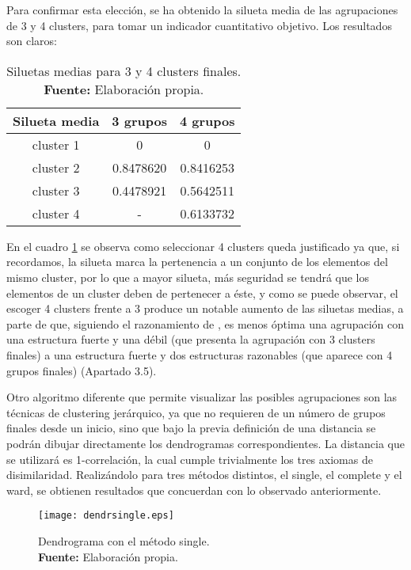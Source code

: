 \documentclass{article}
\begin{document}
Para confirmar esta elección, se ha obtenido la silueta media de las agrupaciones de 3 y 4 clusters, para tomar un indicador cuantitativo objetivo. Los resultados son claros:


\begin{table}[H]
\centering
\begin{tabular}{|c|cc|}
\hline
\textbf{Silueta media} & 3 grupos  & 4 grupos  \\ \hline
cluster 1              & 0         & 0         \\
cluster 2              & 0.8478620 & 0.8416253 \\
cluster 3              & 0.4478921 & 0.5642511 \\
cluster 4              & -         & 0.6133732 \\ \hline
\end{tabular}
\caption{Siluetas medias para 3 y 4 clusters finales. \\ \textbf{Fuente:} Elaboración propia.}
\label{siluetas}
\end{table}


En el cuadro \ref{siluetas} se observa como seleccionar 4 clusters queda justificado ya que, si recordamos, la silueta marca la pertenencia a un conjunto de los elementos del mismo cluster, por lo que a mayor silueta, más seguridad se tendrá que los elementos de un cluster deben de pertenecer a éste, y como se puede observar, el escoger 4 clusters frente a 3 produce un notable aumento de las siluetas medias, a parte de que, siguiendo el razonamiento de \cite{fgd}, es menos óptima una agrupación con una estructura fuerte y una débil  (que presenta la agrupación con 3 clusters finales) a una estructura fuerte y dos estructuras razonables (que aparece con 4 grupos finales) (Apartado 3.5).

\vspace{0.3cm}

Otro algoritmo diferente que permite visualizar las posibles agrupaciones son las técnicas de clustering jerárquico, ya que no requieren de un número de grupos finales desde un inicio, sino que bajo la previa definición de una distancia se podrán dibujar directamente los dendrogramas correspondientes. La distancia que se utilizará es 1-correlación, la cual cumple trivialmente los tres axiomas de disimilaridad. Realizándolo para tres métodos distintos, el single, el complete y el ward, se obtienen resultados que concuerdan con lo observado anteriormente.


\begin{figure}[H]
\centering
\texttt{[image: dendrsingle.eps]}
\caption{\centering Dendrograma con el método single. \\ \textbf{Fuente:} Elaboración propia.}
\label{dendr1}
\end{figure}
\end{document}
